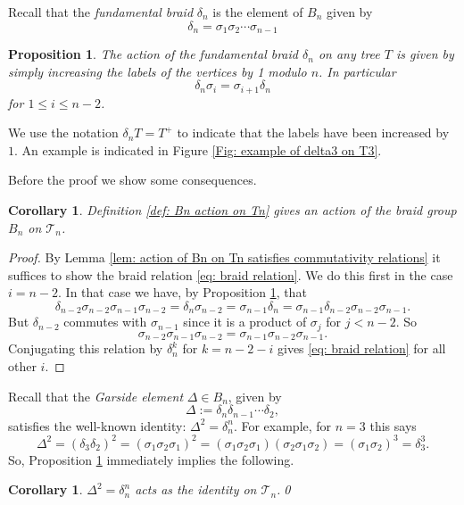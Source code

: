 \documentclass[11pt]{amsart}
\newtheorem{cor}[thm]{Corollary}
\newtheorem{prop}[thm]{Proposition}
\theoremstyle{definition}
\theoremstyle{remark}
\numberwithin{equation}{section}
\newcommand{\cT}{\ensuremath{{\mathcal{T}}}}
\begin{document}
Recall that the \emph{fundamental braid} $\delta_n$ is the element of $B_n$ given by
\[\delta_n=\sigma_1\sigma_2\cdots \sigma_{n-1}\]


\begin{prop}\label{prop: delta T= T+}
    The action of the fundamental braid $\delta_n$ on any tree $T$ is given by simply increasing the labels of the vertices by 1 modulo $n$. In particular
    \[
    	\delta_n \sigma_i=\sigma_{i+1}\delta_n
    \]
    for $1\le i\le n-2$.
\end{prop} 

We use the notation $\delta_nT=T^+$ to indicate that the labels have been increased by $1$. An example is indicated in Figure \ref{Fig: example of delta3 on T3}.

Before the proof we show some consequences.

\begin{cor}\label{cor: braid relations hold}
Definition \ref{def: Bn action on Tn} gives an action of the braid group $B_n$ on $\cT_n$.
\end{cor}

\begin{proof}
By Lemma \ref{lem: action of Bn on Tn satisfies commutativity relations} it suffices to show the braid relation \eqref{eq: braid relation}. We do this first in the case $i=n-2$. In that case we have, by Proposition \ref{prop: delta T= T+}, that
\[
 \delta_{n-2}\sigma_{n-2}\sigma_{n-1}\sigma_{n-2}=\delta_n\sigma_{n-2}=\sigma_{n-1}\delta_n=\sigma_{n-1}\delta_{n-2}\sigma_{n-2}\sigma_{n-1}.
 \]
 But $\delta_{n-2}$ commutes with $\sigma_{n-1}$ since it is a product of $\sigma_j$ for $j<n-2$.  So
 \[
 	\sigma_{n-2}\sigma_{n-1}\sigma_{n-2}=\sigma_{n-1}\sigma_{n-2}\sigma_{n-1}.
 \]
 Conjugating this relation by $\delta_n^k$ for $k=n-2-i$ gives \eqref{eq: braid relation} for all other $i$.
\end{proof}

Recall \cite{Garside} that the \emph{Garside element} $\Delta\in B_n$, given by
\[
\Delta:=\delta_n\delta_{n-1}\cdots\delta_2,
\]
satisfies the well-known identity: $\Delta^2=\delta_n^n$. For example, for $n=3$ this says
\[
\Delta^2=(\delta_3\delta_2)^2=(\sigma_1\sigma_2\sigma_1)^2=(\sigma_1\sigma_2\sigma_1)(\sigma_2\sigma_1\sigma_2)=(\sigma_1\sigma_2)^3=\delta_3^3.
\]
 So, Proposition \ref{prop: delta T= T+} immediately implies the following.

\begin{cor}
$\Delta^2=\delta_n^n$ acts as the identity on $\cT_n$.\qed
\end{cor}
\end{document}
